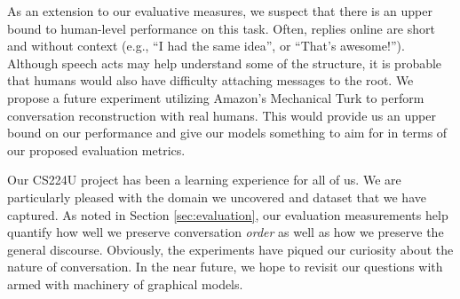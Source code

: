\documentclass{article}
\begin{document}
As an extension to our evaluative measures, we suspect that there is an upper
bound to human-level performance on this task. Often, replies online are short
and without context (e.g., ``I had the same idea'', or ``That's awesome!'').
Although speech acts may help understand some of the structure, it is probable
that humans would also have difficulty attaching messages to the root. We
propose a future experiment utilizing Amazon's Mechanical Turk to perform
conversation reconstruction with real humans. This would provide us an upper
bound on our performance and give our models something to aim for in terms of
our proposed evaluation metrics.

Our CS224U project has been a learning experience for all of us. We are
particularly pleased with the domain we uncovered and dataset that we have
captured. As noted in Section \ref{sec:evaluation}, our evaluation
measurements help quantify how well we preserve conversation \textit{order} as
well as how we preserve the general discourse. Obviously, the experiments have
piqued our curiosity about the nature of conversation. In the near future, we
hope to revisit our questions with armed with machinery of graphical models.

{} 

\end{document}
